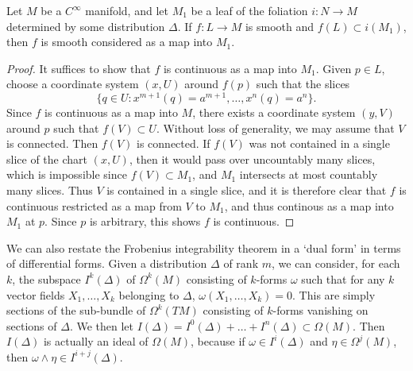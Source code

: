 \begin{theorem}
    Let $M$ be a $C^\infty$ manifold, and let $M_1$ be a leaf of the foliation $i: N \to M$ determined by some distribution $\Delta$. If $f: L \to M$ is smooth and $f(L) \subset i(M_1)$, then $f$ is smooth considered as a map into $M_1$.
\end{theorem}
\begin{proof}
    It suffices to show that $f$ is continuous as a map into $M_1$. Given $p \in L$, choose a coordinate system $(x,U)$ around $f(p)$ such that the slices
    \[ \{ q \in U : x^{m+1}(q) = a^{m+1}, \dots, x^n(q) = a^n \}. \]
    Since $f$ is continuous as a map into $M$, there exists a coordinate system $(y,V)$ around $p$ such that $f(V) \subset U$. Without loss of generality, we may assume that $V$ is connected. Then $f(V)$ is connected. If $f(V)$ was not contained in a single slice of the chart $(x,U)$, then it would pass over uncountably many slices, which is impossible since $f(V) \subset M_1$, and $M_1$ intersects at most countably many slices. Thus $V$ is contained in a single slice, and it is therefore clear that $f$ is continuous restricted as a map from $V$ to $M_1$, and thus continous as a map into $M_1$ at $p$. Since $p$ is arbitrary, this shows $f$ is continuous.
\end{proof}

We can also restate the Frobenius integrability theorem in a `dual form' in terms of differential forms. Given a distribution $\Delta$ of rank $m$, we can consider, for each $k$, the subspace $I^k(\Delta)$ of $\Omega^k(M)$ consisting of $k$-forms $\omega$ such that for any $k$ vector fields $X_1, \dots, X_k$ belonging to $\Delta$, $\omega(X_1, \dots, X_k) = 0$. This are simply sections of the sub-bundle of $\Omega^k(TM)$ consisting of $k$-forms vanishing on sections of $\Delta$. We then let $I(\Delta) = I^0(\Delta) + \dots + I^n(\Delta) \subset \Omega(M)$. Then $I(\Delta)$ is actually an ideal of $\Omega(M)$, because if $\omega \in I^i(\Delta)$ and $\eta \in \Omega^j(M)$, then $\omega \wedge \eta \in I^{i+j}(\Delta)$.

